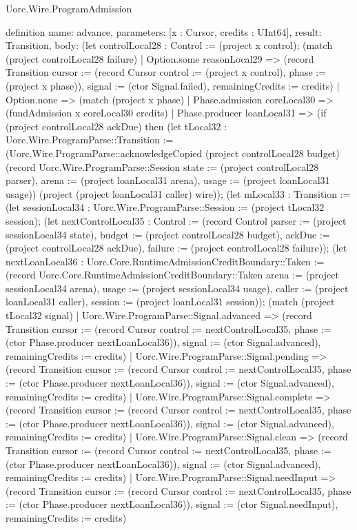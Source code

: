 \begin{lexlean}{Uorc.Wire.ProgramAdmission}
\begin{semanticmodule}
definition{
  name: advance,
  parameters: [x : Cursor, credits : UInt64],
  result: Transition,
  body: (let controlLocal28 : Control := (project x control); (match (project controlLocal28 failure)
    | Option.some reasonLocal29 => (record Transition {cursor := (record Cursor {control := (project x control), phase := (project x phase)}), signal := (ctor Signal.failed), remainingCredits := credits})
    | Option.none => (match (project x phase)
      | Phase.admission coreLocal30 => (fundAdmission x coreLocal30 credits)
      | Phase.producer loanLocal31 => (if (project controlLocal28 ackDue) then (let tLocal32 : Uorc.Wire.ProgramParse::Transition := (Uorc.Wire.ProgramParse::acknowledgeCopied (project controlLocal28 budget) (record Uorc.Wire.ProgramParse::Session {state := (project controlLocal28 parser), arena := (project loanLocal31 arena), usage := (project loanLocal31 usage)}) (project (project loanLocal31 caller) wire)); (let mLocal33 : Transition := (let sessionLocal34 : Uorc.Wire.ProgramParse::Session := (project tLocal32 session); (let nextControlLocal35 : Control := (record Control {parser := (project sessionLocal34 state), budget := (project controlLocal28 budget), ackDue := (project controlLocal28 ackDue), failure := (project controlLocal28 failure)}); (let nextLoanLocal36 : Uorc.Core.RuntimeAdmissionCreditBoundary::Taken := (record Uorc.Core.RuntimeAdmissionCreditBoundary::Taken {arena := (project sessionLocal34 arena), usage := (project sessionLocal34 usage), caller := (project loanLocal31 caller), session := (project loanLocal31 session)}); (match (project tLocal32 signal)
        | Uorc.Wire.ProgramParse::Signal.advanced => (record Transition {cursor := (record Cursor {control := nextControlLocal35, phase := (ctor Phase.producer nextLoanLocal36)}), signal := (ctor Signal.advanced), remainingCredits := credits})
        | Uorc.Wire.ProgramParse::Signal.pending => (record Transition {cursor := (record Cursor {control := nextControlLocal35, phase := (ctor Phase.producer nextLoanLocal36)}), signal := (ctor Signal.advanced), remainingCredits := credits})
        | Uorc.Wire.ProgramParse::Signal.complete => (record Transition {cursor := (record Cursor {control := nextControlLocal35, phase := (ctor Phase.producer nextLoanLocal36)}), signal := (ctor Signal.advanced), remainingCredits := credits})
        | Uorc.Wire.ProgramParse::Signal.clean => (record Transition {cursor := (record Cursor {control := nextControlLocal35, phase := (ctor Phase.producer nextLoanLocal36)}), signal := (ctor Signal.advanced), remainingCredits := credits})
        | Uorc.Wire.ProgramParse::Signal.needInput => (record Transition {cursor := (record Cursor {control := nextControlLocal35, phase := (ctor Phase.producer nextLoanLocal36)}), signal := (ctor Signal.needInput), remainingCredits := credits})
}
\end{semanticmodule}
\end{lexlean}
